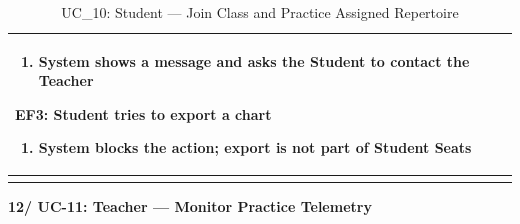\documentclass[a4paper]{article}
\newlength{\ucLeft}
\begin{document}
\begin{longtable}{|>{\bfseries}p{\ucLeft}|p{\dimexpr\linewidth-\ucLeft-2\tabcolsep-2\arrayrulewidth}|}
\begin{enumerate}[leftmargin=1.5em, nosep, topsep=2pt, partopsep=0pt, parsep=0pt, after=\strut]
    \item System shows a message and asks the Student to contact the Teacher
\end{enumerate}
\textbf{EF3: Student tries to export a chart}
\begin{enumerate}[leftmargin=1.5em, nosep, topsep=2pt, partopsep=0pt, parsep=0pt, after=\strut]
    \item System blocks the action; export is not part of Student Seats
\end{enumerate}
\\ \hline
\caption{UC\_10: Student --- Join Class and Practice Assigned Repertoire}\label{tab:uc10_student}
\end{longtable}

\vspace{0.5em}
\noindent\textbf{12/ UC-11: Teacher --- Monitor Practice Telemetry}
\end{document}

